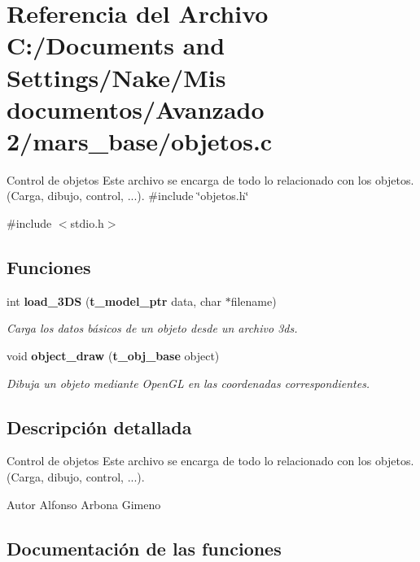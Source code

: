 \section{Referencia del Archivo C:/Documents and Settings/Nake/Mis documentos/Avanzado 2/mars\_\-base/objetos.c}
\label{objetos_8c}


Control de objetos Este archivo se encarga de todo lo relacionado con los objetos. (Carga, dibujo, control, ...).  
{\ttfamily \#include \char`\"{}objetos.h\char`\"{}}\par
{\ttfamily \#include $<$stdio.h$>$}\par
\subsection*{Funciones}
\begin{DoxyCompactItemize}
\item 
int {\bf load\_\-3DS} ({\bf t\_\-model\_\-ptr} data, char $\ast$filename)
\begin{DoxyCompactList}\small\item\em Carga los datos básicos de un objeto desde un archivo 3ds. \item\end{DoxyCompactList}\item 
void {\bf object\_\-draw} ({\bf t\_\-obj\_\-base} object)
\begin{DoxyCompactList}\small\item\em Dibuja un objeto mediante OpenGL en las coordenadas correspondientes. \item\end{DoxyCompactList}\end{DoxyCompactItemize}


\subsection{Descripción detallada}
Control de objetos Este archivo se encarga de todo lo relacionado con los objetos. (Carga, dibujo, control, ...). \begin{DoxyAuthor}{Autor}
Alfonso Arbona Gimeno 
\end{DoxyAuthor}


\subsection{Documentación de las funciones}
